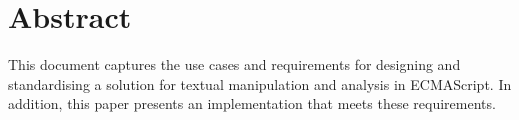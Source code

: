 
\begingroup
\let\clearpage\relax
\let\cleardoublepage\relax
\let\cleardoublepage\relax

\chapter*{Abstract}

This document captures the use cases and requirements for designing and
standardising a solution for textual manipulation and analysis in
ECMAScript. In addition, this paper presents an implementation that
meets these requirements.

\endgroup

